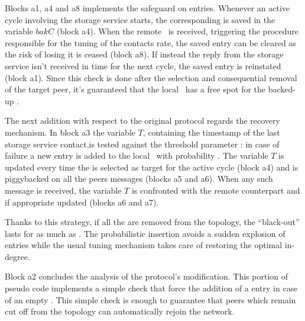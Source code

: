 Blocks a1, a4 and a8 implements the safeguard on
\cloud entries. Whenever an active cycle involving the storage
service starts, the corresponding \cloud \descriptor is saved in the
variable $bakC$ (block a4). When the remote \view\ is received,
triggering the procedure responsible for the tuning of the
\cloud contacts rate, the saved entry can be cleared as the risk of
losing it is ceased (block a8). If instead the reply from the storage
service isn't received in time for the next cycle, the saved entry is
reinstated (block a1). Since this check is done after the selection and
consequential removal of the target peer, it's guaranteed that the local
\view\ has a free spot for the backed-up \cloud \descriptor.

The next addition with respect to the original protocol regards the
recovery mechanism. In block a3 the variable $T$, containing the
timestamp of the last storage service contact,is tested against the
threshold parameter \maxsilence: in case of failure a new
\cloud entry is added to the local \view\ with probability
\spawnprob. The variable $T$ is updated every time the
\cloud is selected as target for the active cycle (block a4) and is
piggybacked on all the peers messages (blocks a5 and a6). When any
such message is received, the variable $T$ is confronted with the
remote counterpart and if appropriate updated (blocks a6 and a7).

Thanks to this strategy, if all the \cloud \descriptor are removed
from the topology, the ``black-out'' lasts for as much as
\maxsilence. The probabilistic insertion avoids a sudden explosion of
\cloud entries while the usual tuning mechanism takes care of
restoring the optimal in-degree.

Block a2 concludes the analysis of the protocol's modification. This
portion of pseudo code implements a simple check that force the
addition of a \cloud entry in case of an empty \view. This simple
check is enough to guarantee that peers which remain cut off from the
topology can automatically rejoin the network.
